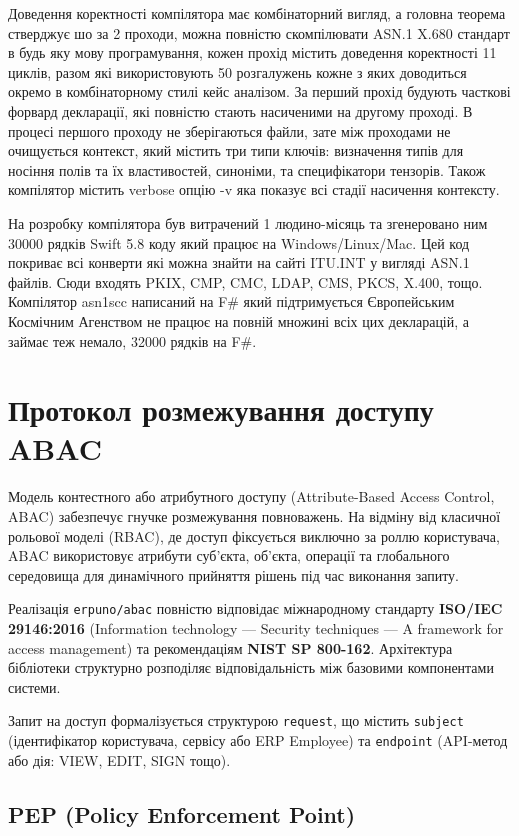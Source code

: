 Доведення коректності компілятора має комбінаторний вигляд, а головна теорема стверджує шо за 2 проходи, можна повністю скомпілювати ASN.1 X.680 стандарт в будь яку мову програмування, кожен прохід містить доведення коректності 11 циклів, разом які використовують 50 розгалужень кожне з яких доводиться окремо в комбінаторному стилі кейс аналізом. За перший прохід будують часткові форвард декларації, які повністю стають насиченими на другому проході. В процесі першого проходу не зберігаються файли, зате між проходами не очищується контекст, який містить три типи ключів: визначення типів для носіння полів та їх властивостей, синоніми, та специфікатори тензорів. Також компілятор містить verbose опцію -v яка показує всі стадії насичення контексту.

На розробку компілятора був витрачений 1 людино-місяць та згенеровано ним 30000 рядків Swift 5.8 коду який працює на Windows/Linux/Mac. Цей код покриває всі конверти які можна знайти на сайті ITU.INT у вигляді ASN.1 файлів. Сюди входять PKIX, CMP, CMC, LDAP, CMS, PKCS, X.400, тощо. Компілятор asn1scc написаний на F\# який підтримується Європейським Космічним Агенством не працює на повній множині всіх цих декларацій, а займає теж немало, 32000 рядків на F\#.


\section{Протокол розмежування доступу ABAC}

Модель контестного або атрибутного доступу (Attribute-Based Access Control, ABAC) забезпечує гнучке розмежування повноважень. На відміну від класичної рольової моделі (RBAC), де доступ фіксується виключно за роллю користувача, ABAC використовує атрибути суб'єкта, об'єкта, операції та глобального середовища для динамічного прийняття рішень під час виконання запиту. 

Реалізація \texttt{erpuno/abac} повністю відповідає міжнародному стандарту \textbf{ISO/IEC 29146:2016} (Information technology — Security techniques — A framework for access management) та рекомендаціям \textbf{NIST SP 800-162}. Архітектура бібліотеки структурно розподіляє відповідальність між базовими компонентами системи.

Запит на доступ формалізується структурою \texttt{request}, що містить \texttt{subject} (ідентифікатор користувача, сервісу або ERP Employee) та \texttt{endpoint} (API-метод або дія: VIEW, EDIT, SIGN тощо).

\subsection{PEP (Policy Enforcement Point)}

